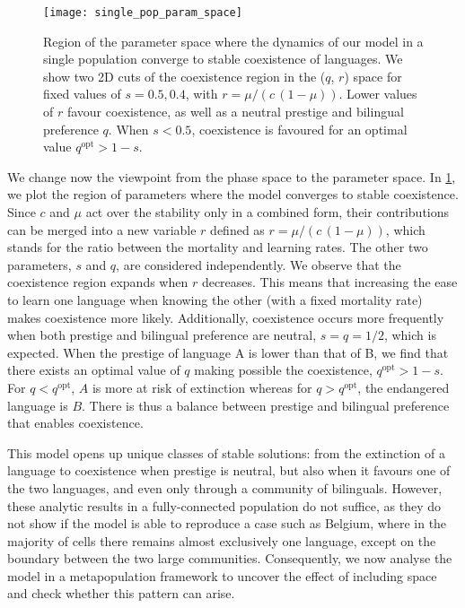 \documentclass[../thesis.tex]{subfiles}
\begin{document}
\begin{figure}[h]
  \centering
  \texttt{[image: single\_pop\_param\_space]}
  \caption{Region of the parameter space where the dynamics of our model in a single
  population converge to stable coexistence of languages. We show two 2D cuts of the
  coexistence region in the ($q$, $r$) space for fixed values of $s=0.5, 0.4$, with $r
  = \mu / (c \, (1-\mu))$. Lower values of $r$ favour coexistence, as well as a
  neutral prestige and bilingual preference $q$. When $s < 0.5$, coexistence is
  favoured for an optimal value $q^\text{opt} > 1-s$.}
  \label{fig:coex_region}
\end{figure}

We change now the viewpoint from the phase space to the parameter space. In
\cref{fig:coex_region}, we plot the region of parameters where the model converges to
stable coexistence. Since $c$ and $\mu$ act over the stability only in a combined form,
their contributions can be merged into a new variable $r$ defined as $r = \mu/(c \,
(1-\mu))$, which stands for the ratio between the mortality and learning rates. The
other two parameters, $s$ and $q$, are considered independently. We observe that the
coexistence region expands when $r$ decreases. This means that increasing the ease to
learn one language when knowing the other (with a fixed mortality rate) makes
coexistence more likely. Additionally, coexistence occurs more frequently when both
prestige and bilingual preference are neutral, $s = q = 1/2$, which is expected. When
the prestige of language A is lower than that of B, we find that there exists an optimal
value of $q$ making possible the coexistence, $q^\text{opt} > 1-s$. For $q <
q^\text{opt}$, $A$ is more at risk of extinction whereas for $q > q^\text{opt}$, the
endangered language is $B$. There is thus a balance between prestige and bilingual
preference that enables coexistence. 

This model opens up unique classes of stable solutions: from the extinction of a
language to coexistence when prestige is neutral, but also when it favours one of the
two languages, and even only through a community of bilinguals. However, these analytic
results in a fully-connected population do not suffice, as they do not show if the model
is able to reproduce a case such as Belgium, where in the majority of cells there
remains almost exclusively one language, except on the boundary between the two large
communities. Consequently, we now analyse the model in a metapopulation framework to
uncover the effect of including space and check whether this pattern can arise.
\end{document}
